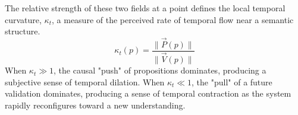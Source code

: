 The relative strength of these two fields at a point defines the local temporal curvature, \(\kappa_t\), a measure of the perceived rate of temporal flow near a semantic structure.
\begin{equation}
\kappa_t(p) = \frac{\|\vec{P}(p)\|}{\|\vec{V}(p)\|}
\end{equation}
When \(\kappa_t \gg 1\), the causal "push" of propositions dominates, producing a subjective sense of temporal dilation. When \(\kappa_t \ll 1\), the "pull" of a future validation dominates, producing a sense of temporal contraction as the system rapidly reconfigures toward a new understanding. 